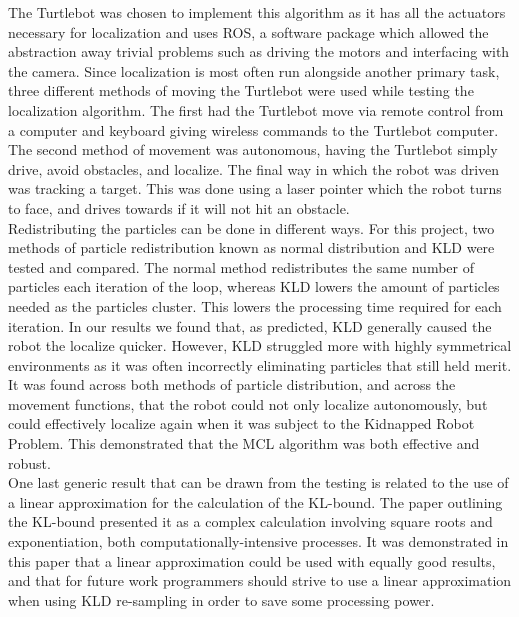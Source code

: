 \documentclass{article}
\begin{document}
The Turtlebot was chosen to implement this algorithm as it has all the actuators necessary for localization and uses ROS, a software package which allowed the abstraction away trivial problems such as driving the motors and interfacing with the camera. Since localization is most often run alongside another primary task, three different methods of moving the Turtlebot were used while testing the localization algorithm. The first had the Turtlebot move via remote control from a computer and keyboard giving wireless commands to the Turtlebot computer. The second method of movement was autonomous, having the Turtlebot simply drive, avoid obstacles, and localize. The final way in which the robot was driven was tracking a target. This was done using a laser pointer which the robot turns to face, and drives towards if it will not hit an obstacle.\\

Redistributing the particles can be done in different ways. For this project, two methods of particle redistribution known as normal distribution and KLD were tested and compared. The normal method redistributes the same number of particles each iteration of the loop, whereas KLD lowers the amount of particles needed as the particles cluster. This lowers the processing time required for each iteration. In our results we found that, as predicted, KLD generally caused the robot the localize quicker. However, KLD struggled more with highly symmetrical environments as it was often incorrectly eliminating particles that still held merit.\\

It was found across both methods of particle distribution, and across the movement functions, that the robot could not only localize autonomously, but could effectively localize again when it was subject to the Kidnapped Robot Problem. This demonstrated that the MCL algorithm was both effective and robust.\\

One last generic result that can be drawn from the testing is related to the use of a linear approximation for the calculation of the KL-bound. The paper outlining the KL-bound presented it as a complex calculation involving square roots and exponentiation, both computationally-intensive processes. It was demonstrated in this paper that a linear approximation could be used with equally good results, and that for future work programmers should strive to use a linear approximation when using KLD re-sampling in order to save some processing power.
\end{document}
